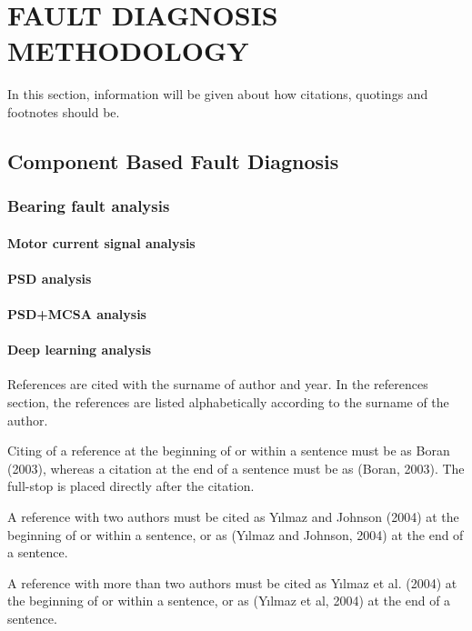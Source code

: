 \chapter{FAULT DIAGNOSIS METHODOLOGY}\label{Ch4}

In this section, information will be given about how citations, quotings and footnotes should be.

\section{Component Based Fault Diagnosis}

\subsection{Bearing fault analysis}
\subsubsection{Motor current signal analysis}
\subsubsection{PSD analysis}
\subsubsection{PSD+MCSA analysis}
\subsubsection{Deep learning analysis}

References are cited with the surname of author and year. In the references section, the references are listed alphabetically according to the surname of the author.

Citing of a reference at the beginning of or within a sentence must be as Boran (2003), whereas a citation at the end of a sentence must be as (Boran, 2003). The full-stop is placed directly after the citation.
 
A reference with two authors must be cited as Yılmaz and Johnson (2004) at the beginning of or within a sentence, or as (Yılmaz and Johnson, 2004) at the end of a sentence. 

A reference with more than two authors must be cited as Yılmaz et al. (2004) at the beginning of or within a sentence, or as (Yılmaz et al, 2004) at the end of a sentence. 

